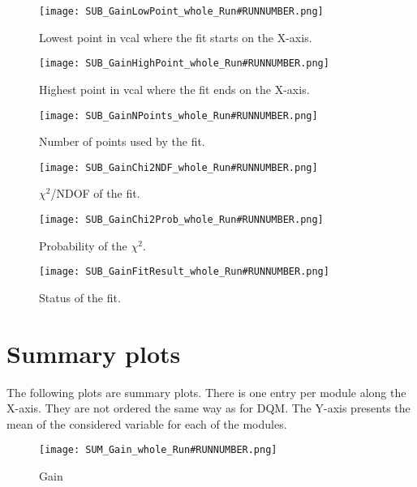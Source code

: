 \documentclass[a4paper,10pt]{article}
\begin{document}
\begin{figure}[htp]
 \centering
  \texttt{[image: SUB\_GainLowPoint\_whole\_Run\#RUNNUMBER.png]}
\caption{Lowest point in vcal where the fit starts on the X-axis.}
\end{figure}


\begin{figure}[htp]
 \centering
  \texttt{[image: SUB\_GainHighPoint\_whole\_Run\#RUNNUMBER.png]}
\caption{Highest point in vcal where the fit ends on the X-axis.}
\end{figure}


\begin{figure}[htp]
 \centering
  \texttt{[image: SUB\_GainNPoints\_whole\_Run\#RUNNUMBER.png]}
\caption{Number of points used by the fit.}
\end{figure}


\begin{figure}[htp]
 \centering
  \texttt{[image: SUB\_GainChi2NDF\_whole\_Run\#RUNNUMBER.png]}
\caption{$\chi^2$/NDOF of the fit.}
\end{figure}


\begin{figure}[htp]
 \centering
  \texttt{[image: SUB\_GainChi2Prob\_whole\_Run\#RUNNUMBER.png]}
\caption{Probability of the $\chi^2$.}
\end{figure}

\begin{figure}[htp]
 \centering
  \texttt{[image: SUB\_GainFitResult\_whole\_Run\#RUNNUMBER.png]}
\caption{Status of the fit.}
\end{figure}

\clearpage
\pagebreak




\section{Summary plots\label{sec:summary}}

The following plots are summary plots. There is one entry per module along the X-axis. They are not ordered the same way as for DQM. The Y-axis presents the mean of the considered variable for each of the modules.

\begin{figure}[htp]
 \centering
\texttt{[image: SUM\_Gain\_whole\_Run\#RUNNUMBER.png]}
\caption{Gain}
\end{figure}
\end{document}

